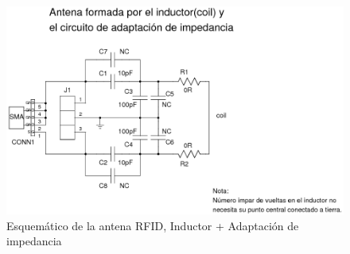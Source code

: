 \begin{figure}[H]
\centering
  \begin{center}
  \includegraphics[scale=.48]{Imagenes/rfid_coil.png}
  \end{center}
  \caption{Esquemático de la antena RFID, Inductor + Adaptación de impedancia}\label{Fig:RFID2} 
\end{figure}

